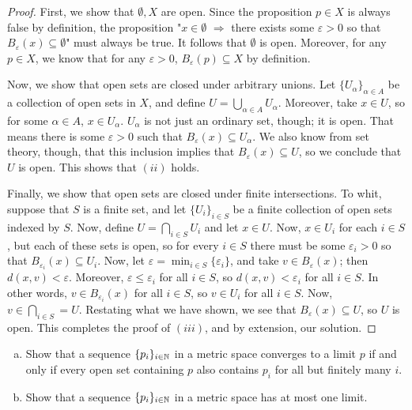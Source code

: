\documentclass[./main.tex]{subfiles}
\begin{document}
\begin{proof}
    First, we show that $\emptyset, X$ are open. Since the proposition $p\in X$ is always false by definition, the
    proposition "$x\in \emptyset$ $\Rightarrow$ there exists some $\varepsilon>0$ so that $B_\varepsilon(x)\subseteq\emptyset$" 
    must always be true. It follows that $\emptyset$ is open. Moreover, for any $p\in X$, we know that for any 
    $\varepsilon>0$, $B_\varepsilon(p)\subseteq X$ by definition.

    Now, we show that open sets are closed under arbitrary unions. Let $\{U_\alpha\}_{\alpha\in A}$ be a collection of
    open sets in $X$, and define $U = \bigcup_{\alpha\in A}U_\alpha$. Moreover, take $x\in U$, so for some 
    $\alpha\in A$, $x\in U_\alpha$. $U_\alpha$ is not just an ordinary set, though; it is open. That means there 
    is some $\varepsilon>0$ such that $B_\varepsilon(x)\subseteq U_\alpha$. We also know from set theory, though, 
    that this inclusion implies that $B_\varepsilon(x)\subseteq U$, so we conclude that $U$ is open. This shows that $(ii)$ holds.

    Finally, we show that open sets are closed under finite intersections. To whit, suppose that $S$ is a finite set, 
    and let $\{U_i\}_{i\in S}$ be a finite collection of open sets indexed by $S$. Now, define $U=\bigcap_{i\in S}U_i$ and
    let $x\in U$. Now, $x\in U_i$ for each $i\in S$, but each of these sets is open, so for every $i\in S$ there must be some 
    $\varepsilon_i>0$ so that $B_{\varepsilon_i}(x)\subseteq U_i$. Now, let $\varepsilon = \min_{i\in S}\{\varepsilon_i\}$, and 
    take $v\in B_\varepsilon(x)$; then $d(x,v)<\varepsilon$. Moreover, $\varepsilon\leq \varepsilon_i$ for all $i\in S$,
    so $d(x,v)<\varepsilon_i$ for all $i\in S$. In other words, $v\in B_{\varepsilon_i}(x)$ for all $i\in S$, so $v\in U_i$ 
    for all $i\in S$. Now, $v\in \bigcap_{i\in S}=U$. Restating what we have shown, we see that $B_{\varepsilon}(x)\subseteq U$,
    so $U$ is open. This completes the proof of $(iii)$, and by extension, our solution.
\end{proof}

\begin{fprob}
    \begin{enumerate}[(a)]
        \item Show that a sequence $\{p_i\}_{i\in\mathbb{N}}$ in a metric space converges 
        to a limit $p$ if and only if every open set containing $p$ also contains $p_i$ 
        for all but finitely many $i$.
        \item Show that a sequence $\{p_i\}_{i\in\mathbb{N}}$ in a metric space has at most one limit.
    \end{enumerate}
\end{fprob}
\end{document}
